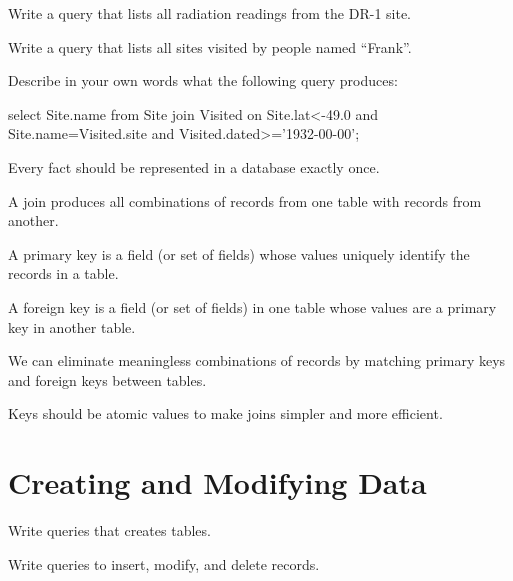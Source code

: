 \begin{challenge}
  Write a query that lists all radiation readings from the DR-1 site.
\end{challenge}

\begin{challenge}
  Write a query that lists all sites visited by people named ``Frank''.
\end{challenge}

\begin{challenge}
  Describe in your own words what the following query produces:

\begin{VerbIn}
select Site.name from Site join Visited
on Site.lat<-49.0 and Site.name=Visited.site and Visited.dated>='1932-00-00';
\end{VerbIn}
\end{challenge}

\begin{keypoints}
\begin{swcitemize}
\item
  Every fact should be represented in a database exactly once.
\item
  A join produces all combinations of records from one table with
  records from another.
\item
  A primary key is a field (or set of fields) whose values uniquely
  identify the records in a table.
\item
  A foreign key is a field (or set of fields) in one table whose values
  are a primary key in another table.
\item
  We can eliminate meaningless combinations of records by matching
  primary keys and foreign keys between tables.
\item
  Keys should be atomic values to make joins simpler and more efficient.
\end{swcitemize}
\end{keypoints}

\section{Creating and Modifying Data}

\begin{objectives}
\begin{swcitemize}
\item
  Write queries that creates tables.
\item
  Write queries to insert, modify, and delete records.
\end{swcitemize}
\end{objectives}


